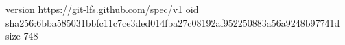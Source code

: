 version https://git-lfs.github.com/spec/v1
oid sha256:6bba585031bbfc11c7ce3ded014fba27c08192af952250883a56a9248b97741d
size 748
